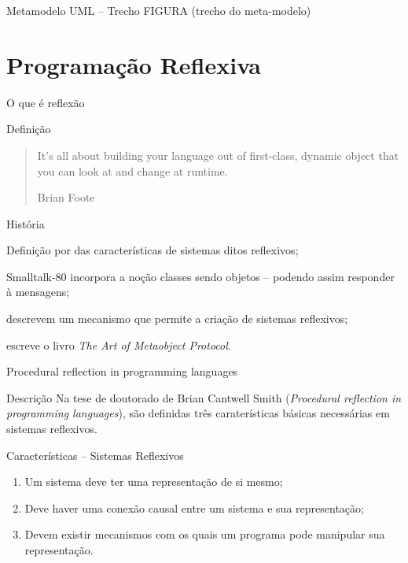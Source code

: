 \documentclass[12pt,t]{beamer}
\begin{document}
	 \begin{frame}{Metamodelo UML -- Trecho}
	 		\alert{FIGURA (trecho do meta-modelo)}
	 \end{frame}
 \section{Programação Reflexiva}
	 \begin{frame}{O que é reflexão}
	 	\begin{block}{Definição}
	 		\begin{quote}
				It's all about building your language out of first-class, dynamic object that you can look at and change at runtime.
	 		\begin{flushright}
	 			Brian Foote
	 		\end{flushright} 	 		
	 		\end{quote}
	 	\end{block}
	 	\begin{block}{História}
	 		\begin{description}[9999]
	 			\item[1982] Definição por  das características de sistemas ditos reflexivos;
	 			\item[1983] Smalltalk-80 incorpora a noção classes sendo objetos -- podendo assim responder à mensagens;
	 			\item[1984]  descrevem um mecanismo que permite a criação de sistemas reflexivos;
	 			\item[1991]  escreve o livro \emph{The Art of Metaobject Protocol}.
	 		\end{description}
	 	\end{block}	
	 \end{frame}
	 \begin{frame}{Procedural reflection in programming languages \cite{smith1982reflection}}
	 	\begin{block}{Descrição}
	 		Na tese de doutorado de Brian Cantwell Smith (\emph{Procedural reflection in programming languages}), são definidas três caraterísticas básicas necessárias em sistemas reflexivos. 
	 	\end{block}
	 	\begin{block}{Características -- Sistemas Reflexivos}
	 	  \begin{enumerate}
	 	  	\item Um sistema deve ter uma representação de si mesmo;
	 	  	\item Deve haver uma conexão causal entre um sistema e sua representação;
	 	  	\item Devem existir mecanismos com os quais um programa pode manipular sua representação. 
	 	  \end{enumerate}
	 	\end{block}
	 \end{frame}
\end{document}
